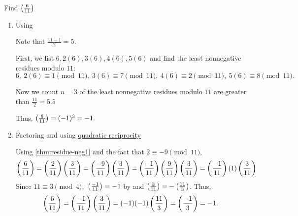 \documentclass{ximera}
\begin{document}
\begin{example}
	Find $\left(\frac{6}{11}\right)$ 
		
	\begin{enumerate}
		\item Using 
		\begin{solution}
			Note that $\frac{11-1}{2}=5$.

			First, we list $6,2(6),3(6),4(6),5(6)$ and find the least nonnegative residues modulo $11:$
			\[ 6,\ 2(6)\equiv 1\pmod{11},\ 3(6)\equiv 7\pmod{11},
			\ 4(6)\equiv 2\pmod{11},\ 5(6)\equiv 8\pmod{11}. \]

			Now we count $n=3$ of the least nonnegative residues modulo $11$ are greater than $\frac{11}{2}=5.5$

			Thus, $\left(\frac{6}{11}\right)=(-1)^3=-1.$
		\end{solution}

		\item Factoring and using \hyperref[quad-rec-standard-form]{quadratic reciprocity}
			
		\begin{solution}
			Using \cref{thm:residue-neg1} and the fact that $2\equiv -9\pmod{11},$ 
			\begin{align*}
				\left(\frac{6}{11}\right)&=\left(\frac{2}{11}\right)\left(\frac{3}{11}\right)
					=\left(\frac{-9}{11}\right)\left(\frac{3}{11}\right)=\left(\frac{-1}{11}\right)\left(\frac{9}{11}\right)\left(\frac{3}{11}\right)=\left(\frac{-1}{11}\right)(1)\left(\frac{3}{11}\right)
			\end{align*}
			Since $11\equiv 3\pmod{4},$ $\left(\frac{-1}{11}\right)=-1$ by  and $\left(\frac{3}{11}\right)=-\left(\frac{11}{3}\right)$. Thus, 
			\begin{align*}
				\left(\frac{6}{11}\right)&=\left(\frac{-1}{11}\right)\left(\frac{3}{11}\right)=(-1)(-1)\left(\frac{11}{3}\right)=\left(\frac{-1}{3}\right)=-1.
			\end{align*}
		\end{solution}
	\end{enumerate}
\end{example}
\end{document}
